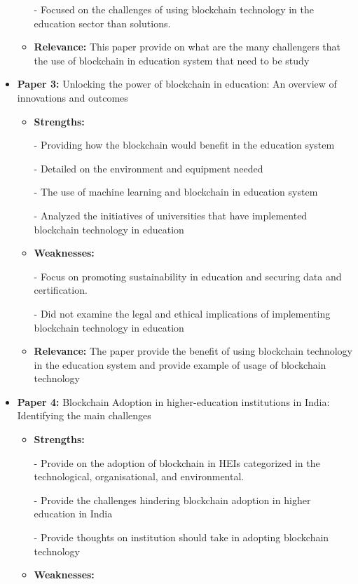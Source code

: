 \documentclass[12pt,a4paper]{article}
\begin{document}
\begin{itemize}
\begin{itemize}
        - Focused on the challenges of using blockchain technology in the education sector than solutions.
        
        \item \textbf{Relevance: } This paper provide on what are the many challengers that the use of blockchain in education system that need to be study
    \end{itemize}
    \item \textbf{Paper 3:} Unlocking the power of blockchain in education: An overview of innovations and outcomes
    \begin{itemize}
        \item \textbf{Strengths:} 

        - Providing how the blockchain would benefit in the education system

        - Detailed on the environment and equipment needed

        - The use of machine learning and blockchain in education system

        - Analyzed the initiatives of universities that have implemented blockchain technology in education
        \item \textbf{Weaknesses:} 

        - Focus on promoting sustainability in education and securing data and certification.

        - Did not examine the legal and ethical implications of implementing blockchain technology in education
        \item \textbf{Relevance: } The paper provide the benefit of using blockchain technology in the education system and provide example of usage of blockchain technology
    \end{itemize}
    \item \textbf{Paper 4:} Blockchain Adoption in higher-education institutions in India: Identifying the main challenges
    \begin{itemize}
        \item \textbf{Strengths:} 

        - Provide on the adoption of blockchain in HEIs categorized in the technological, organisational, and environmental.

        - Provide the challenges hindering blockchain adoption in higher education in India

        - Provide thoughts on institution should take in adopting blockchain technology
        \item \textbf{Weaknesses:} 


\end{itemize}
\end{itemize}
\end{document}
